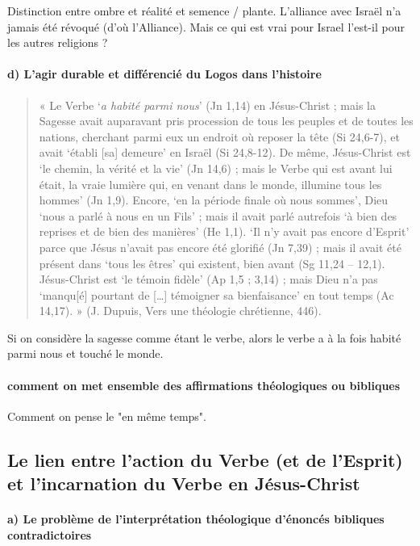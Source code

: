 Distinction entre ombre et réalité et semence / plante. L'alliance avec Israël n'a jamais été révoqué (d'où l'Alliance). Mais ce qui est vrai pour Israel l'est-il pour les autres religions ? 


\paragraph{d) L’agir durable et différencié du Logos dans l’histoire}

\begin{quote}
    « Le Verbe ‘\textit{a habité parmi nous}’ (Jn 1,14) en Jésus-Christ ; mais la Sagesse avait auparavant pris
procession de tous les peuples et de toutes les nations, cherchant parmi eux un endroit où reposer la
tête (Si 24,6-7), et avait ‘établi [sa] demeure’ en Israël (Si 24,8-12). De même, Jésus-Christ est ‘le
chemin, la vérité et la vie’ (Jn 14,6) ; mais le Verbe qui est avant lui était, la vraie lumière qui, en
venant dans le monde, illumine tous les hommes’ (Jn 1,9). Encore, ‘en la période finale où nous
sommes’, Dieu ‘nous a parlé à nous en un Fils’ ; mais il avait parlé autrefois ‘à bien des reprises et de
bien des manières’ (He 1,1). ‘Il n’y avait pas encore d’Esprit’ parce que Jésus n’avait pas encore été
glorifié (Jn 7,39) ; mais il avait été présent dans ‘tous les êtres’ qui existent, bien avant (Sg 11,24 –
12,1). Jésus-Christ est ‘le témoin fidèle’ (Ap 1,5 ; 3,14) ; mais Dieu n’a pas ‘manqu[é] pourtant de
[…] témoigner sa bienfaisance’ en tout temps (Ac 14,17). » (J. Dupuis, Vers une théologie chrétienne,
446).
\end{quote}
Si on considère la sagesse comme étant le verbe, alors le verbe a à la fois habité parmi nous et touché le monde.

\paragraph{comment on met ensemble des affirmations théologiques ou bibliques} Comment on pense le "en même temps". 


\subsection{Le lien entre l’action du Verbe (et de l’Esprit) et l’incarnation du Verbe en Jésus-Christ}
\paragraph{a) Le problème de l’interprétation théologique d’énoncés bibliques contradictoires}

